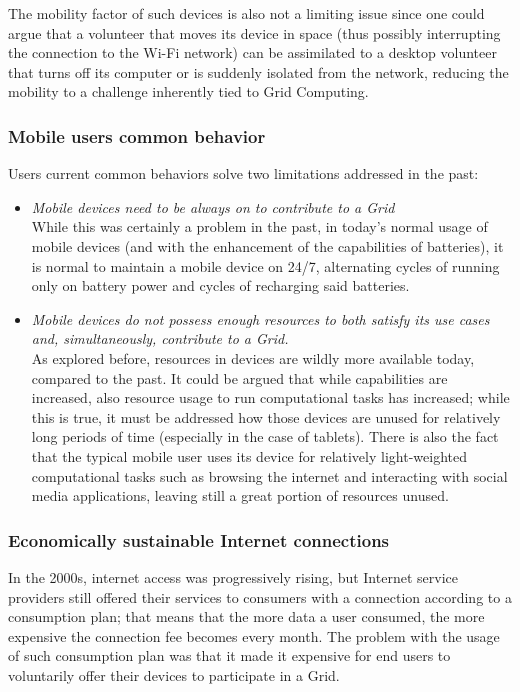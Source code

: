 The mobility factor of such devices is also not a limiting issue since one could argue that a volunteer that moves its device in space (thus possibly interrupting the connection to the Wi-Fi network) can be assimilated to a desktop volunteer that turns off its computer or is suddenly isolated from the network, reducing the mobility to a challenge inherently tied to Grid Computing.

\subsubsection{Mobile users common behavior}
Users current common behaviors solve two limitations addressed in the past:
\begin{itemize}
    \item \textit{Mobile devices need to be always on to contribute to a Grid}\\
    While this was certainly a problem in the past, in today's normal usage of mobile devices (and with the enhancement of the capabilities of batteries), it is normal to maintain a mobile device on 24/7, alternating cycles of running only on battery power and cycles of recharging said batteries.
    \item \textit{Mobile devices do not possess enough resources to both satisfy its use cases and, simultaneously, contribute to a Grid.}\\
    As explored before, resources in devices are wildly more available today, compared to the past. It could be argued that while capabilities are increased, also resource usage to run computational tasks has increased; while this is true, it must be addressed how those devices are unused for relatively long periods of time (especially in the case of tablets). There is also the fact that the typical mobile user uses its device for relatively light-weighted computational tasks such as browsing the internet and interacting with social media applications, leaving still a great portion of resources unused.
\end{itemize}

\subsubsection{Economically sustainable Internet connections}
In the 2000s, internet access was progressively rising, but Internet service providers still offered their services to consumers with a connection according to a consumption plan; that means that the more data a user consumed, the more expensive the connection fee becomes every month. The problem with the usage of such consumption plan was that it made it expensive for end users to voluntarily offer their devices to participate in a Grid.

